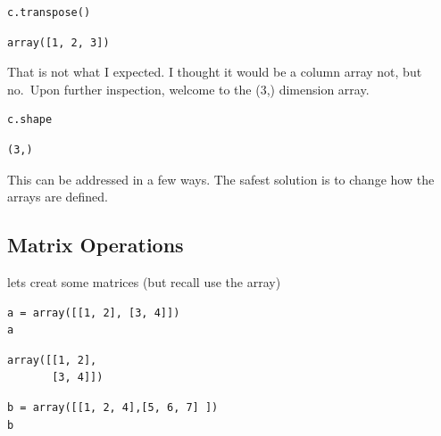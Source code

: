 \documentclass[%
oneside,                 %
final,                   %
10pt]{article}
\begin{document}
\begin{verbatim}
c.transpose()
\end{verbatim}

\begin{verbatim}
array([1, 2, 3])
\end{verbatim}

That is not what I expected. I thought it would be a column array not, but no.~Upon further inspection, welcome to the (3,) dimension array.

\begin{verbatim}
c.shape
\end{verbatim}

\begin{verbatim}
(3,)
\end{verbatim}

This can be addressed in a few ways. The safest solution is to change how the arrays are defined.

\subsection{Matrix Operations}

lets creat some matrices (but recall use the array)

\begin{verbatim}
a = array([[1, 2], [3, 4]])
a
\end{verbatim}

\begin{verbatim}
array([[1, 2],
       [3, 4]])
\end{verbatim}

\begin{verbatim}
b = array([[1, 2, 4],[5, 6, 7] ])
b
\end{verbatim}
\end{document}
